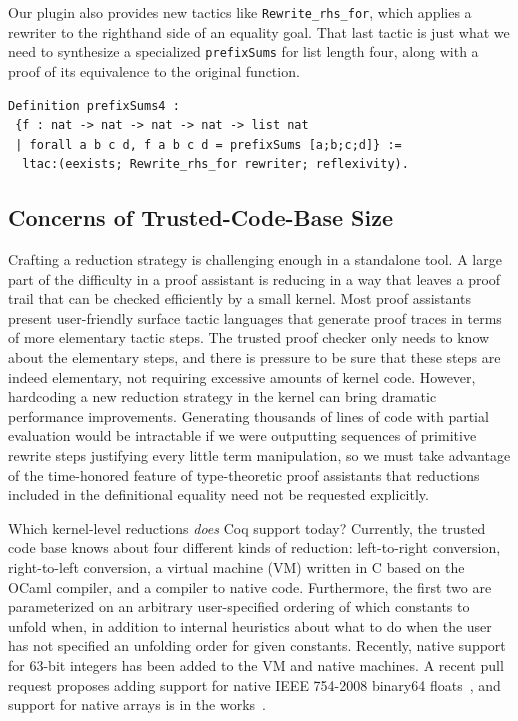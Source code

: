 Our plugin also provides new tactics like \texttt{Rewrite_rhs_for}, which applies a rewriter to the righthand side of an equality goal.
That last tactic is just what we need to synthesize a specialized \texttt{prefixSums} for list length four, along with a proof of its equivalence to the original function.
\begin{verbatim}
Definition prefixSums4 :
 {f : nat -> nat -> nat -> nat -> list nat
 | forall a b c d, f a b c d = prefixSums [a;b;c;d]} :=
  ltac:(eexists; Rewrite_rhs_for rewriter; reflexivity).
\end{verbatim}


\subsection{Concerns of Trusted-Code-Base Size} \label{sec:trusted-code-base-size}

Crafting a reduction strategy is challenging enough in a standalone tool.
A large part of the difficulty in a proof assistant is reducing in a way that leaves a proof trail that can be checked efficiently by a small kernel.
Most proof assistants present user-friendly surface tactic languages that generate proof traces in terms of more elementary tactic steps.
The trusted proof checker only needs to know about the elementary steps, and there is pressure to be sure that these steps are indeed elementary, not requiring excessive amounts of kernel code.
However, hardcoding a new reduction strategy in the kernel can bring dramatic performance improvements.
Generating thousands of lines of code with partial evaluation would be intractable if we were outputting sequences of primitive rewrite steps justifying every little term manipulation, so we must take advantage of the time-honored feature of type-theoretic proof assistants that reductions included in the definitional equality need not be requested explicitly.

Which kernel-level reductions \emph{does} Coq support today?
Currently, the trusted code base knows about four different kinds of reduction: left-to-right conversion, right-to-left conversion, a virtual machine (VM) written in C based on the OCaml compiler, and a compiler to native code.
Furthermore, the first two are parameterized on an arbitrary user-specified ordering of which constants to unfold when, in addition to internal heuristics about what to do when the user has not specified an unfolding order for given constants.
Recently, native support for 63-bit integers has been added to the VM and native machines.
A recent pull request proposes adding support for native IEEE 754-2008 binary64 floats~\cite{coq-pr-floats}, and support for native arrays is in the works~\cite{denes2013prim-ints-arrays}.

